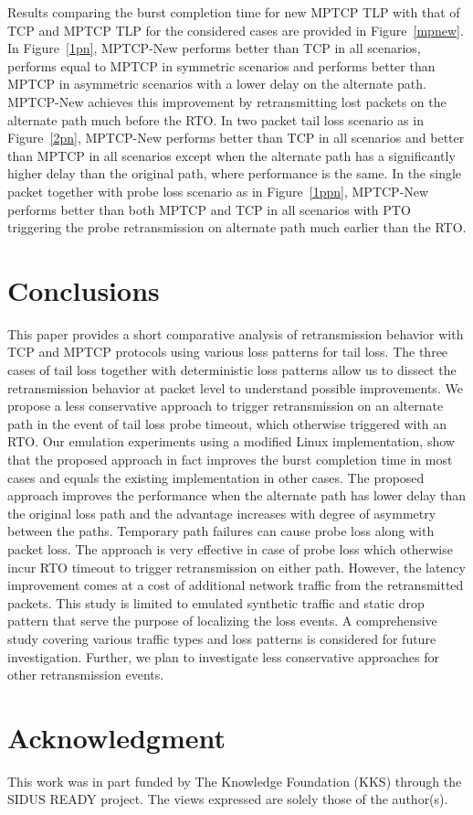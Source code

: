 \documentclass[10pt,conference]{IEEEtran}
\begin{document}
Results comparing the burst completion time for new MPTCP TLP with that of TCP and MPTCP TLP for the considered cases are provided in 
Figure~\ref{mpnew}. In Figure~\ref{1pn}, MPTCP-New performs better than TCP in all scenarios, performs equal to MPTCP in symmetric scenarios and 
performs better than MPTCP in asymmetric scenarios with a lower delay on the alternate path. MPTCP-New achieves this improvement by retransmitting
 lost packets on the alternate path much before the RTO. In two packet tail loss scenario as in Figure~\ref{2pn}, MPTCP-New
performs better than TCP in all scenarios and better than MPTCP in all scenarios except when the alternate path has a significantly higher delay 
than the original path, where performance is the same. In the single packet together with probe loss scenario as in Figure~\ref{1ppn}, MPTCP-New 
performs better than both MPTCP and TCP in all scenarios with PTO triggering the probe retransmission on alternate path much earlier than the RTO.


\section{Conclusions}\label{conc}
This paper provides a short comparative analysis of retransmission behavior with TCP and MPTCP protocols using various loss patterns for tail loss.
The three cases of tail loss together with deterministic loss patterns allow us to dissect the retransmission behavior at packet level to 
understand possible improvements.
We propose a less conservative approach to trigger retransmission on an alternate path in the event of tail loss probe timeout, which otherwise 
triggered with an RTO. Our emulation experiments  using a modified Linux implementation, show that the proposed approach in fact improves the 
burst completion time in most cases and equals the existing implementation in other cases. The proposed approach improves the performance when 
the alternate path has lower delay than the original loss path and the advantage increases with degree of asymmetry between the paths. 
Temporary path failures can cause probe loss along with packet loss. The approach is very effective in case of probe loss which otherwise 
incur RTO timeout to trigger retransmission on either path. However, the latency improvement comes at a cost of additional network traffic 
from the retransmitted packets. This study is limited to emulated synthetic traffic and static drop pattern that serve the purpose of localizing 
the loss events. A comprehensive study covering various traffic types and loss patterns is considered for future investigation. Further, we plan 
to investigate less conservative approaches for other retransmission events.

\section*{Acknowledgment}
This work was in part funded by The Knowledge Foundation (KKS) through the SIDUS READY project. The views expressed are solely those of the 
author(s).
   


\end{document}
